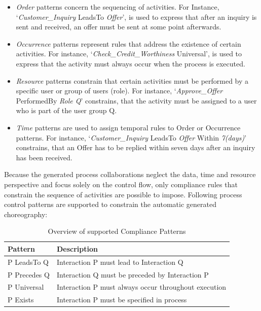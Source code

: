 \begin{itemize}
\item \textit{Order} patterns concern the sequencing of activities. For Instance, `\textit{Customer\_Inquiry} LeadsTo \textit{Offer}', is used to express that after an inquiry is sent and received, an offer must be sent at some point afterwards.
\item \textit{Occurrence} patterns represent rules that address the existence of certain activities. For instance, `\textit{Check\_Credit\_Worthiness} Universal', is used to express that the activity must always occur when the process is executed. 
\item \textit{Resource} patterns constrain that certain activities must be performed by a specific user or group of users (role). For instance, `\textit{Approve\_Offer} PerformedBy \textit{Role Q}' constrains, that the activity must be assigned to a user who is part of the user group Q.    
\item \textit{Time} patterns are used to assign temporal rules to Order or Occurrence patterns. For instance, `\textit{Customer\_Inquiry} LeadsTo \textit{Offer} Within \textit{7(days)}' constrains, that an Offer has to be replied within seven days after an inquiry has been received. 
\end{itemize}

Because the generated process collaborations neglect the data, time and resource perspective and focus solely on the control flow, only compliance rules that constrain the sequence of activities are possible to impose. Following process control patterns are supported to constrain the automatic generated choreography:

\begin{table}[H]
\centering
\resizebox{12cm}{!}
{
\begin{tabular}{l|l}
Pattern		      & Description  \\ \hline
P LeadsTo Q       & Interaction P must lead to Interaction Q	  	 \\
P Precedes Q      & Interaction Q must be preceded by Interaction P	  \\
P Universal  	  & Interaction P must always occur throughout execution \\
P Exists		  & Interaction P must be specified in process \\
\end{tabular}%
}
\caption{Overview of supported Compliance Patterns}
\label{tab:compl_patterns}
\end{table}

